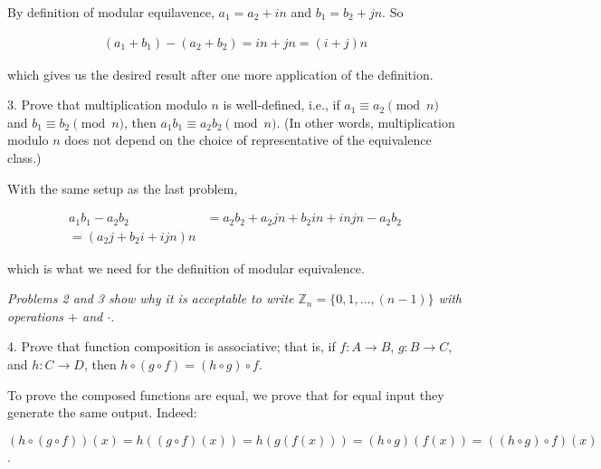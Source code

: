 \documentclass[12pt]{article} %
\newcommand{\Z}{\mathbb{Z}}
\begin{document}
\begin{flushleft}
\vspace{0.5cm}

By definition of modular equilavence, $a_1 = a_2 + in$ and $b_1 = b_2 + jn$. So

\begin{align*}
  (a_1 + b_1) - (a_2 + b_2) = in + jn = (i+j)n
\end{align*}

which gives us the desired result after one more application of the definition.

\vspace{1cm}

3.  Prove that multiplication modulo $n$ is well-defined, i.e., if $a_1 \equiv a_2 \pmod n$ and $b_1 \equiv b_2 \pmod n$, then $a_1b_1 \equiv {a_2b_2} \pmod n$. (In other words, multiplication modulo $n$ does not depend on the choice of representative of the equivalence class.)\\

\vspace{0.5cm}

With the same setup as the last problem,

\begin{align*}
  a_1 b_1 -a_2b_2 &= a_2 b_2 + a_2jn + b_2in + injn - a_2b_2\\
  = (a_2j+b_2i+ijn)n
\end{align*}

which is what we need for the definition of modular equivalence.

\textit{Problems 2 and 3 show why it is acceptable to write $\Z_n = \{0, 1, \dots, (n-1)\}$ with operations $+$ and $\cdot$.}\\

\vspace{1cm}

4.  Prove that function composition is associative; that is, if $f: A \rightarrow B$, $g: B \rightarrow C$, and $h: C \rightarrow D$, then $h \circ (g \circ f) = (h \circ g) \circ f$.\\

\vspace{0.5cm}

To prove the composed functions are equal, we prove that for equal input they generate the same output. Indeed:

$(h\circ(g\circ f))(x) = h((g\circ f)(x)) = h(g(f(x))) = (h\circ g)(f(x)) = ((h\circ g)\circ f)(x)$.

\vspace{1cm}


\end{flushleft}
\end{document}
